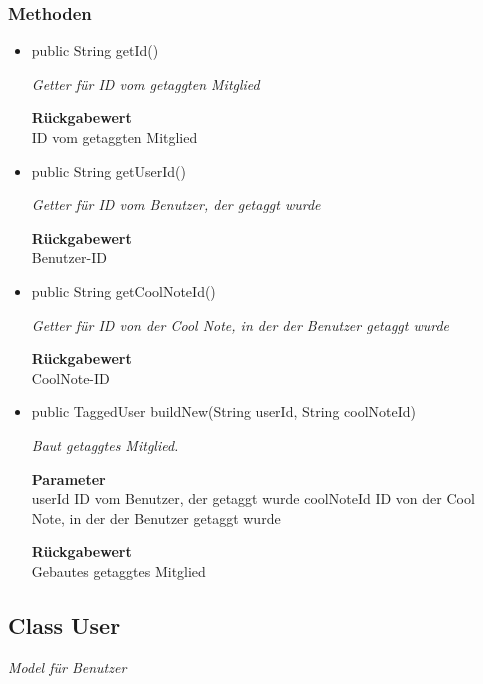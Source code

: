 \documentclass[a4paper]{scrreprt}
\begin{document}
    \subsubsection{Methoden}
    \begin{itemize}
    	\item{public String getId()}
    	
    	\textit{Getter für ID vom getaggten Mitglied}
    	
    	
    	
    	\textbf{Rückgabewert} \\
    	ID vom getaggten Mitglied        \item{public String getUserId()}
    	
    	\textit{Getter für ID vom Benutzer, der getaggt wurde}
    	
    	
    	
    	\textbf{Rückgabewert} \\
    	Benutzer-ID        \item{public String getCoolNoteId()}
    	
    	\textit{Getter für ID von der Cool Note, in der der Benutzer getaggt wurde}
    	
    	
    	
    	\textbf{Rückgabewert} \\
    	CoolNote-ID        \item{public TaggedUser buildNew(String userId, String coolNoteId)}
    	
    	\textit{Baut getaggtes Mitglied.}
    	
    	\textbf{Parameter} \\
    	userId ID vom Benutzer, der getaggt wurde
    	coolNoteId ID von der Cool Note, in der der Benutzer getaggt wurde
    	
    	\textbf{Rückgabewert} \\
    	Gebautes getaggtes Mitglied
    \end{itemize}
    \subsection{Class User}
    \textit{Model für Benutzer}
\end{document}
